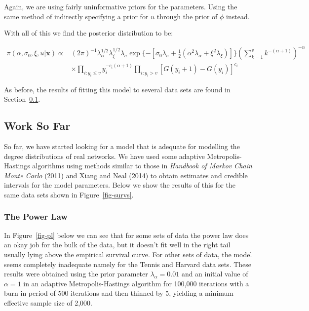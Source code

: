 \documentclass[
]{article}
\begin{document}
Again, we are using fairly uninformative priors for the parameters.
Using the same method of indirectly specifying a prior for \(u\) through
the prior of \(\phi\) instead.

With all of this we find the posterior distribution to be:

\begin{align*}
\pi(\alpha,\sigma_0, \xi, u| \boldsymbol{x}) \propto & (2\pi)^{-1}\lambda_\alpha^{1/2}\lambda_\xi^{1/2}\lambda_\sigma\exp\{-[\sigma_0\lambda_\sigma + \frac{1}{2}(\alpha^2\lambda_\alpha + \xi^2\lambda_\xi)]\} \left(\sum_{k=1}^v k^{-(\alpha+1)}\right)^{-n}\\& \times \prod_{i:y_i\le v}y_i^{-c_i(\alpha+1)}\prod_{i:y_i>v}\left[G(y_i+1) - G(y_i)\right]^{c_i}
\end{align*}

As before, the results of fitting this model to several data sets are
found in Section~\ref{sec-wsf}.

\subsection{Work So Far}\label{sec-wsf}

So far, we have started looking for a model that is adequate for
modelling the degree distributions of real networks. We have used some
adaptive Metropolis-Hastings algorithms using methods similar to those
in \emph{Handbook of Markov Chain Monte Carlo} (2011) and Xiang and Neal
(2014) to obtain estimates and credible intervals for the model
parameters. Below we show the results of this for the same data sets
shown in Figure~\ref{fig-survs}.

\subsubsection{The Power Law}\label{the-power-law}

In Figure~\ref{fig-pl} below we can see that for some sets of data the
power law does an okay job for the bulk of the data, but it doesn't fit
well in the right tail usually lying above the empirical survival curve.
For other sets of data, the model seems completely inadequate namely for
the Tennis and Harvard data sets. These results were obtained using the
prior parameter \(\lambda_\alpha = 0.01\) and an initial value of
\(\alpha=1\) in an adaptive Metropolis-Hastings algorithm for 100,000
iterations with a burn in period of 500 iterations and then thinned by
5, yielding a minimum effective sample size of 2,000.
\end{document}
